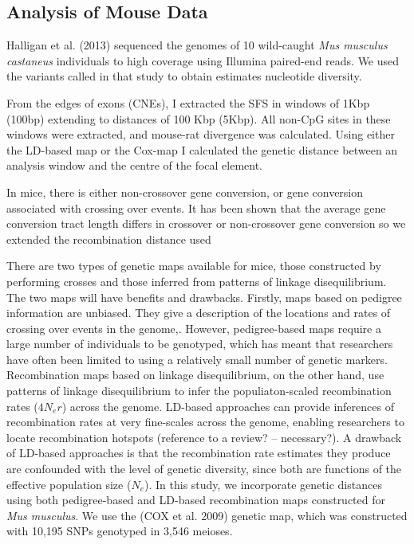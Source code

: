 \documentclass{article}
\begin{document}
	\subsection*{Analysis of Mouse Data}

Halligan et al. (2013) sequenced the genomes of 10 wild-caught \emph{Mus musculus castaneus} individuals to high coverage using Illumina paired-end reads. We used the variants called in that study to obtain estimates nucleotide diversity.

From the edges of exons (CNEs), I extracted the SFS in windows of 1Kbp (100bp) extending to distances of 100 Kbp (5Kbp). All non-CpG sites in these windows were extracted, and mouse-rat divergence was calculated. Using either the LD-based map or the Cox-map I calculated the genetic distance between an analysis window and the centre of the focal element. 

	In mice, there is either non-crossover gene conversion, or gene conversion associated with crossing over events. It has been shown that the average gene conversion tract length differs in crossover or non-crossover gene conversion so we extended the recombination distance used 

	There are two types of genetic maps available for mice, those constructed by performing crosses and those inferred from patterns of linkage disequilibrium. The two maps will have benefits and drawbacks. Firstly, maps based on pedigree information are unbiased. They give a description of the locations and rates of crossing over events in the genome,. However, pedigree-based maps require a large number of individuals to be genotyped, which has meant that researchers have often been limited to using a relatively small number of genetic markers. Recombination maps based on linkage disequilibrium, on the other hand, use patterns of linkage disequilibrium to infer the populiaton-scaled recombination rates ($4N_er$) across the genome. LD-based approaches can provide inferences of recombination rates at very fine-scales across the genome, enabling researchers to locate recombination hotspots (reference to a review? – necessary?). A drawback of LD-based approaches is that the recombination rate estimates they produce are confounded with the level of genetic diversity, since both are functions of the effective population size ($N_e$). In this study, we incorporate genetic distances using both pedigree-based and LD-based recombination maps constructed for \emph{Mus musculus}. We use the (COX et al. 2009) genetic map, which was constructed with 10,195 SNPs genotyped in 3,546 meioses. 
\end{document}
